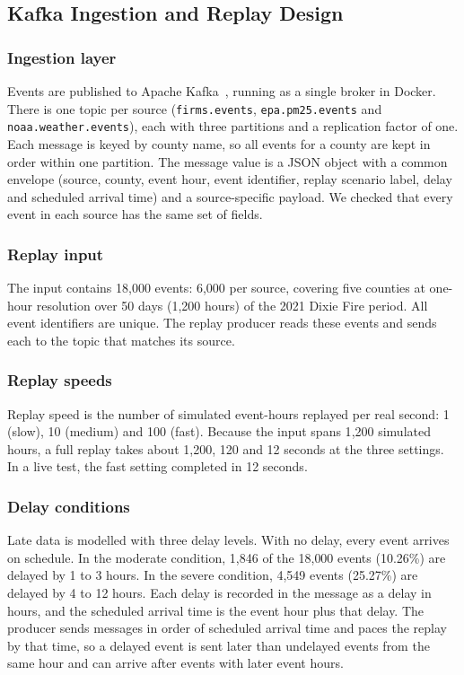 \subsection{Kafka Ingestion and Replay Design}

\subsubsection{Ingestion layer}
Events are published to Apache Kafka~\cite{kreps2011kafka}, running as a single
broker in Docker. There is one topic per source (\texttt{firms.events},
\texttt{epa.pm25.events} and \texttt{noaa.weather.events}), each with three
partitions and a replication factor of one. Each message is keyed by county name,
so all events for a county are kept in order within one partition. The message
value is a JSON object with a common envelope (source, county, event hour, event
identifier, replay scenario label, delay and scheduled arrival time) and a
source-specific payload. We checked that every event in each source has the same
set of fields.

\subsubsection{Replay input}
The input contains 18{,}000 events: 6{,}000 per source, covering five counties
at one-hour resolution over 50 days (1{,}200 hours) of the 2021 Dixie Fire period.
All event identifiers are unique. The replay producer reads these events and
sends each to the topic that matches its source.

\subsubsection{Replay speeds}
Replay speed is the number of simulated event-hours replayed per real second:
1 (slow), 10 (medium) and 100 (fast). Because the input spans 1{,}200 simulated
hours, a full replay takes about 1{,}200, 120 and 12 seconds at the three
settings. In a live test, the fast setting completed in 12 seconds.

\subsubsection{Delay conditions}
Late data is modelled with three delay levels. With no delay, every event arrives
on schedule. In the moderate condition, 1{,}846 of the 18{,}000 events (10.26\%)
are delayed by 1 to 3 hours. In the severe condition, 4{,}549 events (25.27\%) are
delayed by 4 to 12 hours. Each delay is recorded in the message as a delay in
hours, and the scheduled arrival time is the event hour plus that delay. The producer sends messages in order of scheduled arrival time and paces the replay by that time, so a delayed event is sent later than undelayed events from the same hour and can arrive after events with later event hours.

